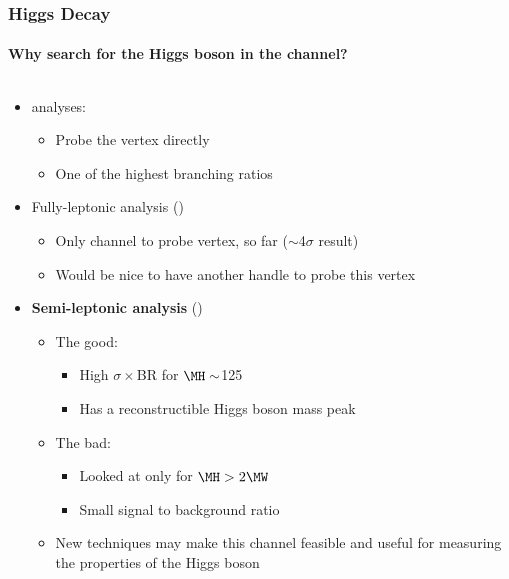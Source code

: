 \begin{frame}
	\frametitle{Higgs Decay}
	\framesubtitle{\small Why search for the Higgs boson in the \HWWlvjj channel?}
	\vspace*{-0.24cm}	
	\begin{columns}[T]
			\vspace*{-0.25cm}
			\begin{block}{}
				\begin{itemize}
					\item \HWW analyses:
					\begin{itemize}
						\item Probe the \HWW vertex directly
						\item One of the highest branching ratios
					\end{itemize}
					\item Fully-leptonic analysis (\HWWlvlv)
					\begin{itemize}
						\item Only channel to probe vertex, so far ($\sim$4$\sigma$ result)
						\item Would be nice to have another handle to probe this vertex
					\end{itemize}
					\item \textbf{Semi-leptonic analysis} (\HWWlvjj)
					\begin{itemize}
						\item The good:
						\begin{itemize}
							\item High $\sigma\times$BR for $\MH\sim$125\GeV
							\item Has a reconstructible Higgs boson mass peak
						\end{itemize}
						\item The bad:
						\begin{itemize}
							\item Looked at only for $\MH>\text{2}\MW$
							\item Small signal to background ratio
						\end{itemize}
						\item New techniques may make this channel feasible and useful for measuring the properties of the Higgs boson

\end{itemize}
\end{itemize}
\end{block}
\end{columns}
\end{frame}
